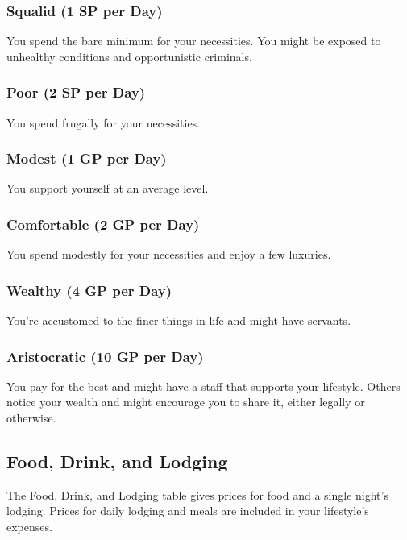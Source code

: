 \documentclass[10pt,a4paper,twoside,bg=print,twocolumn,openany,nodeprecatedcode]{dndbook}
\begin{document}
\subsubsection{Squalid (1 SP per Day)}
You spend the bare minimum for your necessities. You might be exposed to unhealthy conditions and opportunistic criminals.

\subsubsection{Poor (2 SP per Day)}
You spend frugally for your necessities.

\subsubsection{Modest (1 GP per Day)}
You support yourself at an average level.

\subsubsection{Comfortable (2 GP per Day)}
You spend modestly for your necessities and enjoy a few luxuries.

\subsubsection{Wealthy (4 GP per Day)}
You're accustomed to the finer things in life and might have servants.

\subsubsection{Aristocratic (10 GP per Day)}
You pay for the best and might have a staff that supports your lifestyle. Others notice your wealth and might encourage you to share it, either legally or otherwise.

\subsection{Food, Drink, and Lodging}
The Food, Drink, and Lodging table gives prices for food and a single night's lodging. Prices for daily lodging and meals are included in your lifestyle's expenses.
\end{document}

